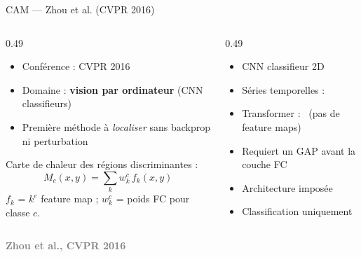 \documentclass[10pt]{beamer}
\newcommand{\source}[1]{\vspace{4pt}\hfill{\textcolor{gray}{\textbf{\tiny #1}}}}
\begin{document}
\begin{frame}{CAM — Zhou et al. (CVPR 2016)}
  \begin{columns}
    \begin{column}{0.49\textwidth}
      \begin{ctxbox}
        \begin{itemize}
          \item Conférence : CVPR 2016
          \item Domaine : \textbf{vision par ordinateur} (CNN classifieurs)
          \item Première méthode à \emph{localiser} sans backprop ni perturbation
        \end{itemize}
      \end{ctxbox}
      \begin{probbox}
        Carte de chaleur des régions discriminantes :
        \[
          M_c(x,y) = \sum_k w_k^c \, f_k(x,y)
        \]
        $f_k$ = $k^e$ feature map ; $w_k^c$ = poids FC pour classe $c$.
      \end{probbox}
    \end{column}
    \begin{column}{0.49\textwidth}
      \begin{transposbox}
        \begin{itemize}
          \item CNN classifieur 2D \checkmark
          \item Séries temporelles : \texttimes
          \item Transformer : \texttimes\ (pas de feature maps)
        \end{itemize}
      \end{transposbox}
      \begin{limitbox}
        \begin{itemize}
          \item Requiert un GAP avant la couche FC
          \item Architecture imposée
          \item Classification uniquement
        \end{itemize}
      \end{limitbox}
    \end{column}
  \end{columns}
  \source{Zhou et al., CVPR 2016}
\end{frame}
\end{document}
